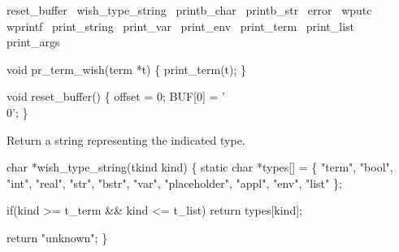 \nwenddocs{}\endmoddef
\LA{}reset_buffer~{\nwtagstyle{}}\RA{}
\LA{}wish_type_string~{\nwtagstyle{}}\RA{}
\LA{}printb_char~{\nwtagstyle{}}\RA{}
\LA{}printb_str~{\nwtagstyle{}}\RA{}
\LA{}error~{\nwtagstyle{}}\RA{}
\LA{}wputc~{\nwtagstyle{}}\RA{}
\LA{}wprintf~{\nwtagstyle{}}\RA{}
\LA{}print_string~{\nwtagstyle{}}\RA{}
\LA{}print_var~{\nwtagstyle{}}\RA{}
\LA{}print_env~{\nwtagstyle{}}\RA{}
\LA{}print_term~{\nwtagstyle{}}\RA{}
\LA{}print_list~{\nwtagstyle{}}\RA{}
\LA{}print_args~{\nwtagstyle{}}\RA{}

void pr_term_wish(term *t)
\{
  print_term(t);
\}
\nwendcode{}\nwdocspar


\nwenddocs{}\endmoddef\let\nwnotused=\nwoutput{}
void reset_buffer()
\{
  offset = 0;
  BUF[0] = '\\0';
\}
\nwendcode{}\nwdocspar


Return a string representing the indicated type.

\nwenddocs{}\endmoddef\let\nwnotused=\nwoutput{}
char *wish_type_string(tkind kind)
\{
  static char *types[] =
    \{ "term", "bool", "int", "real", "str", "bstr", "var",
      "placeholder", "appl", "env", "list"
    \};

  if(kind >= t_term && kind <= t_list)
    return types[kind];

  return "unknown";
\}
\nwendcode{}\nwdocspar

